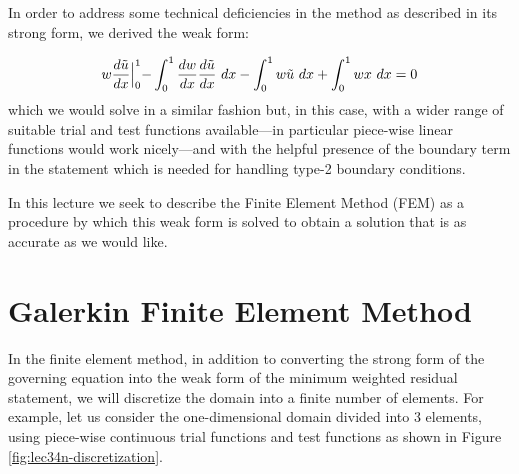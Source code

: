 \noindent In order to address some technical deficiencies in the method as described in its strong form, we derived the weak form:

\vspace{0.25cm}

\begin{equation*}
w \frac{d \tilde u}{dx}\Bigl|_{0}^{1}-\int_{0}^{1}\frac{dw}{dx}\frac{d\tilde{u}}{dx} \ dx - \int_{0}^{1}w \tilde{u} \ dx + \int_{0}^{1} wx \ dx = 0
\end{equation*}
which we would solve in a similar fashion but, in this case, with a wider range of suitable trial and test functions available---in particular piece-wise linear functions would work nicely---and with the helpful presence of the boundary term in the statement which is needed for handling type-2 boundary conditions.
\vspace{0.25cm}

\noindent In this lecture we seek to describe the Finite Element Method (FEM) as a procedure by which this weak form is solved to obtain a solution that is as accurate as we would like.

\section{Galerkin Finite Element Method}

In the finite element method, in addition to converting the strong form of the governing equation into the weak form of the minimum weighted residual statement, we will discretize the domain into a finite number of elements. For example, let us consider the one-dimensional domain divided into 3 elements, using piece-wise continuous trial functions and test functions as shown in Figure \ref{fig:lec34n-discretization}.

